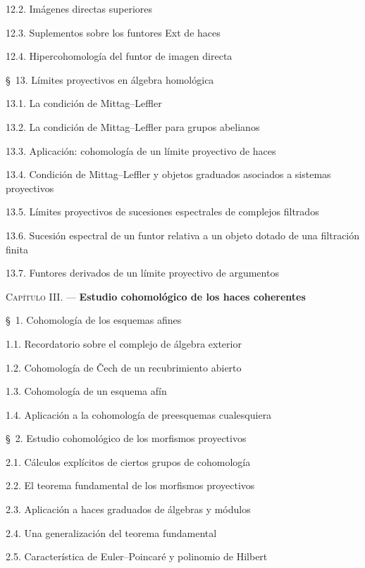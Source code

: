 \documentclass[10pt,oneside,openany]{book}
\theoremstyle{egaenv}\newtheorem*{env}{---}
\theoremstyle{egastatement}
\theoremstyle{egadescription}
\newcommand{\oldpage}[2][]{\marginnote{\normalfont\scriptsize\textbf{#1}\,|\,#2}\ignorespaces}
\begin{document}
\begin{flushleft}
12.2. Imágenes directas superiores 

12.3. Suplementos sobre los funtores Ext de haces 

12.4. Hipercohomología del funtor de imagen directa 

\oldpage[III]{166}

\S~13. Límites proyectivos en álgebra homológica 

13.1. La condición de Mittag--Leffler 

13.2. La condición de Mittag--Leffler para grupos abelianos 

13.3. Aplicación: cohomología de un límite proyectivo de haces 

13.4. Condición de Mittag--Leffler y objetos graduados asociados a sistemas
proyectivos 

13.5. Límites proyectivos de sucesiones espectrales de complejos filtrados

13.6. Sucesión espectral de un funtor relativa a un objeto dotado de una
filtración finita 

13.7. Funtores derivados de un límite proyectivo de argumentos 

\medskip
\textsc{Capítulo III.} --- \textbf{Estudio cohomológico de los haces coherentes}

\medskip
\S~1. Cohomología de los esquemas afines 

1.1. Recordatorio sobre el complejo de álgebra exterior 

1.2. Cohomología de \v Cech de un recubrimiento abierto 

1.3. Cohomología de un esquema afín 

1.4. Aplicación a la cohomología de preesquemas cualesquiera 

\medskip
\S~2. Estudio cohomológico de los morfismos proyectivos 

2.1. Cálculos explícitos de ciertos grupos de cohomología 

2.2. El teorema fundamental de los morfismos proyectivos 

2.3. Aplicación a haces graduados de álgebras y módulos 

2.4. Una generalización del teorema fundamental 

2.5. Característica de Euler--Poincaré y polinomio de Hilbert 


\end{flushleft}
\end{document}
